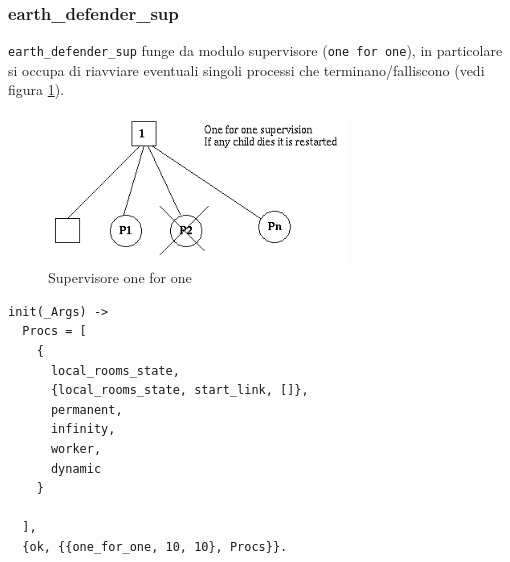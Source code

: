 \documentclass[paper=a4, fontsize=11pt]{scrartcl} %
\numberwithin{equation}{section} %
\numberwithin{figure}{section} %
\numberwithin{table}{section} %
\begin{document}
\subsubsection{earth\_defender\_sup}
\texttt{earth\_defender\_sup} funge da modulo supervisore (\texttt{one for one}), in particolare si occupa di riavviare eventuali singoli processi che terminano/falliscono (vedi figura \ref{Supervisor}).
\begin{figure}
\centering
\includegraphics[width=8cm]{sup4}
\caption{Supervisore one for one}
\label{Supervisor}
\end{figure}
\begin{lstlisting}[basicstyle=\footnotesize]
init(_Args) ->
  Procs = [
    {
      local_rooms_state,
      {local_rooms_state, start_link, []},
      permanent,
      infinity,
      worker,
      dynamic
    }
      
  ],
  {ok, {{one_for_one, 10, 10}, Procs}}.
\end{lstlisting}
\end{document}
